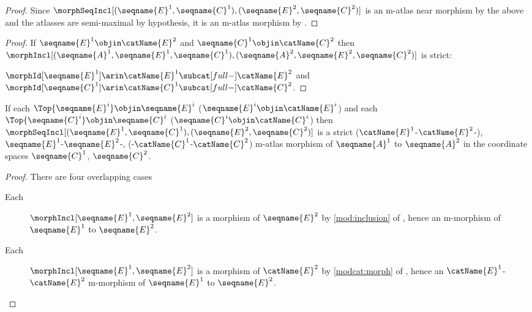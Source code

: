 \documentclass{article}
\begin{document}
\begin{lemma}
\begin{proof}
Since
$
  \morphSeqIncl%
    [
      {(\seqname{E}^1, \seqname{C}^1)},
      {(\seqname{E}^2, \seqname{C}^2)}
    ]
$
is an m-atlas near morphism by the above and the atlasses are
semi-maximal by hypothesis, it is an m-atlas morphism by
.
\end{proof}

\begin{proof}

If $\seqname{E}^1 \objin \catName{E}^2$ and
$\seqname{C}^1 \objin \catName{C}^2$ then
$
\morphIncl%
    [
      {(\seqname{A}^1, \seqname{E}^1, \seqname{C}^1)},
      {(\seqname{A}^2, \seqname{E}^2, \seqname{C}^2)}
    ]
$
is strict:

$\morphId[{\seqname{E}^1}] \arin \catName{E}^1
    \subcat[full-] \catName{E}^2
$ and
$
  \morphId[{\seqname{C}^1}] \arin \catName{C}^1
    \subcat[full-] \catName{C}^2
$.
\end{proof}

If each $\Top{\seqname{E}^i} \objin \seqname{E}^i$
($\seqname{E}^i \objin \catName{E}^i$)
and each $\Top{\seqname{C}^i} \objin \seqname{C}^i$
($\seqname{C}^i \objin \catName{C}^i$) then
$
  \morphSeqIncl%
    [
      {(\seqname{E}^1, \seqname{C}^1)},
      {(\seqname{E}^2, \seqname{C}^2)}
    ]
$
is a strict
\nobreaks
  {
    {($\catName{E}^1$-$\catName{E}^2$-)},
    {$\seqname{E}^1$-$\seqname{E}^2$-},
    {(-$\catName{C}^1$-$\catName{C}^2$)}
  }
m-atlas morphism of
$\seqname{A}^1$ to $\seqname{A}^2$ in the coordinate spaces
$\seqname{C}^1$, $\seqname{C}^2$.

\begin{proof}
There are four overlapping cases
\begin{description}
\item%
  [
    Each
    \ensuremath
      {
        \Top{\seqname{E}^i} \objin \seqname{E}^i
      }:
  ]
$\morphIncl[{\seqname{E}^1},{\seqname{E}^2}]$ is a morphism of
$\seqname{E}^2$ by \cref{mod:inclusion} of
{
  \showlabelsinline
},
hence an m-morphism of $\seqname{E}^1$ to $\seqname{E}^2$.

\item%
  [
    Each
    \ensuremath
      {
        \seqname{E}^i \objin \catName{E}^2
      }:
  ]
$\morphIncl[{\seqname{E}^1},{\seqname{E}^2}]$ is a morphism of
$\catName{E}^2$ by \cref{modcat:morph} of
{
  \showlabelsinline
},
hence an $\catName{E}^1$-$\catName{E}^2$ m-morphism of $\seqname{E}^1$
to $\seqname{E}^2$.


\end{description}
\end{proof}
\end{lemma}
\end{document}
